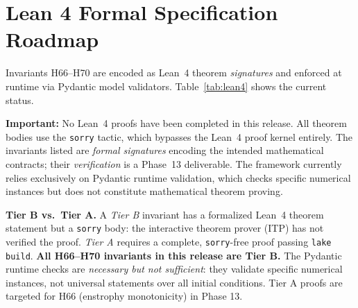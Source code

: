 \documentclass[10pt,twocolumn]{article}
\begin{document}
\section{Lean 4 Formal Specification Roadmap}
\label{sec:lean4}

Invariants H66--H70 are encoded as Lean~4 theorem \emph{signatures} and enforced at
runtime via Pydantic model validators. Table~\ref{tab:lean4} shows the current
status.

\noindent\textbf{Important:} No Lean~4 proofs have been completed in this release.
All theorem bodies use the \texttt{sorry} tactic, which bypasses the Lean~4
proof kernel entirely. The invariants listed are \emph{formal signatures}
encoding the intended mathematical contracts; their \emph{verification}
is a Phase~13 deliverable. The framework currently relies exclusively on
Pydantic runtime validation, which checks specific numerical instances
but does not constitute mathematical theorem proving.

\begin{table}[h]
\centering
\small
\caption{Lean 4 Formal Specifications \& Pydantic Runtime Validation Status}
\label{tab:lean4}
\end{table}

\noindent\textbf{Tier B vs.~Tier A.}
A \textit{Tier B} invariant has a formalized Lean~4 theorem statement but a
\texttt{sorry} body: the interactive theorem prover (ITP) has not verified the
proof. \textit{Tier A} requires a complete, \texttt{sorry}-free proof passing
\texttt{lake build}. \textbf{All H66--H70 invariants in this release are Tier B.}
The Pydantic runtime checks are \emph{necessary but not sufficient}: they validate
specific numerical instances, not universal statements over all initial conditions.
Tier A proofs are targeted for H66 (enstrophy monotonicity) in Phase 13.
\end{document}
